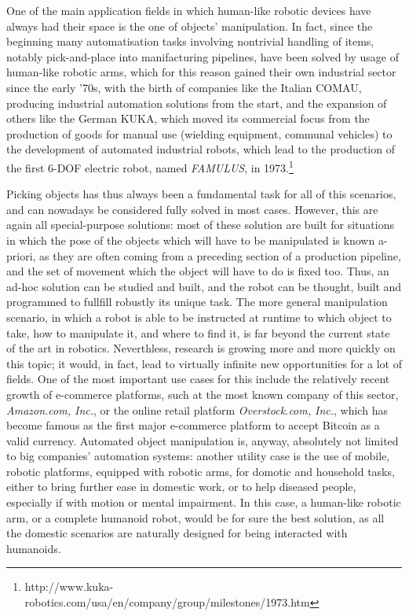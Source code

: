 One of the main application fields in which human-like robotic devices
have always had their space is the one of objects' manipulation. In
fact, since the beginning many automatisation tasks involving
nontrivial handling of items, notably pick-and-place into
manifacturing pipelines, have been solved by usage of human-like
robotic arms, which for this reason gained their own industrial sector
since the early '70s, with the birth of companies like the Italian COMAU,
producing industrial automation solutions from the start, and the
expansion of others like the German KUKA, which moved its commercial
focus from the production of goods for manual use (wielding equipment,
communal vehicles) to the development of automated industrial robots,
which lead to the production of the first 6-DOF electric robot, named
\emph{FAMULUS}, in 1973.\footnote{http://www.kuka-robotics.com/usa/en/company/group/milestones/1973.htm}

Picking objects has thus always been a fundamental task for all of this
scenarios, and can nowadays be considered fully solved in most
cases. However, this are again all special-purpose solutions: most of
these solution are built for situations in which the pose of the
objects which will have to be manipulated is known a-priori, as they
are often coming from a preceding section of a production pipeline,
and the set of movement which the object will have to do is fixed
too. Thus, an ad-hoc solution can be studied and built, and the robot
can be thought, built and programmed to fullfill robustly its unique
task. The more general manipulation scenario, in which a robot is able
to be instructed at runtime to which object to take, how to manipulate
it, and where to find it, is far beyond the current state of the art
in robotics. Neverthless, research is growing more and more
quickly on this topic; it would, in fact, lead to virtually infinite
new opportunities for a lot of fields. One of the most important use
cases for this include
the relatively recent growth of e-commerce platforms, such at the 
most known company of this sector, \emph{Amazon.com, Inc.}, or the
online retail platform \emph{Overstock.com, Inc.}, which has become
famous as the first major e-commerce platform to accept Bitcoin as a
valid currency. Automated object manipulation is, anyway, absolutely
not limited to big companies' automation systems: another utility case
is the use of mobile, robotic platforms, equipped with robotic arms,
for domotic and household tasks, either to bring further ease in
domestic work, or to help diseased people, especially if with motion
or mental impairment. In this case, a human-like robotic arm, or a
complete humanoid robot, would be for sure the best solution, as all
the domestic scenarios are naturally designed for being interacted
with humanoids.

